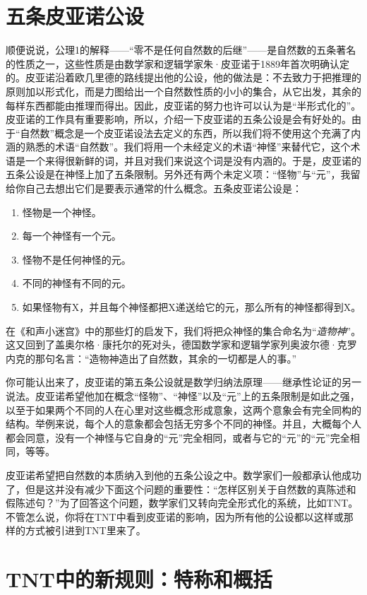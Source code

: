 \section{五条皮亚诺公设}

顺便说说，公理1的解释——“零不是任何自然数的后继”——是自然数的五条著名的性质之一，这些性质是由数学家和逻辑学家朱·皮亚诺于1889年首次明确认定的。皮亚诺沿着欧几里德的路线提出他的公设，他的做法是：不去致力于把推理的原则加以形式化，而是力图给出一个自然数性质的小小的集合，从它出发，其余的每样东西都能由推理而得出。因此，皮亚诺的努力也许可以认为是“半形式化的”。皮亚诺的工作具有重要影响，所以，介绍一下皮亚诺的五条公设是会有好处的。由于“自然数”概念是一个皮亚诺设法去定义的东西，所以我们将不使用这个充满了内涵的熟悉的术语“自然数”。我们将用一个未经定义的术语“神怪”来替代它，这个术语是一个来得很新鲜的词，并且对我们来说这个词是没有内涵的。于是，皮亚诺的五条公设是在神怪上加了五条限制。另外还有两个未定义项：“怪物”与“元”，我留给你自己去想出它们是要表示通常的什么概念。五条皮亚诺公设是：
\begin{enumerate}
\item 怪物是一个神怪。
\item 每一个神怪有一个元。
\item 怪物不是任何神怪的元。
\item 不同的神怪有不同的元。
\item 如果怪物有X，并且每个神怪都把X递送给它的元，那么所有的神怪都得到X。
\end{enumerate}
在《和声小迷宫》中的那些灯的启发下，我们将把众神怪的集合命名为“\emph{造物神}”。这又回到了盖奥尔格·康托尔的死对头，德国数学家和逻辑学家列奥波尔德·克罗内克的那句名言：“造物神造出了自然数，其余的一切都是人的事。”

你可能认出来了，皮亚诺的第五条公设就是数学归纳法原理——继承性论证的另一说法。皮亚诺希望他加在概念“怪物”、“神怪”以及“元”上的五条限制是如此之强，以至于如果两个不同的人在心里对这些概念形成意象，这两个意象会有完全同构的结构。举例来说，每个人的意象都会包括无穷多个不同的神怪。并且，大概每个人都会同意，没有一个神怪与它自身的“元”完全相同，或者与它的“元”的“元”完全相同，等等。

皮亚诺希望把自然数的本质纳入到他的五条公设之中。数学家们一般都承认他成功了，但是这并没有减少下面这个问题的重要性：“怎样区别关于自然数的真陈述和假陈述句？”为了回答这个问题，数学家们又转向完全形式化的系统，比如TNT。不管怎么说，你将在TNT中看到皮亚诺的影响，因为所有他的公设都以这样或那样的方式被引进到TNT里来了。

\section{TNT中的新规则：特称和概括}

